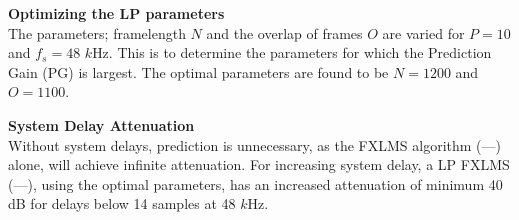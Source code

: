 \large

\begin{minipage}{.43\columnwidth}
 \textbf{Optimizing the LP parameters}\\
The parameters; framelength $N$ and the overlap of frames $O$ are varied for $P=10$ and $f_s=48$ $k$Hz. This is to determine the parameters for which the Prediction Gain (PG) is largest. 
 	The optimal parameters are found to be $N=1200$ and $O=1100$.
	\label{fig:HammingNOP10}
\end{minipage}%
\hspace{4mm}
\begin{minipage}[]{0.5\columnwidth}
	
\end{minipage}

\vspace{4mm}
\begin{minipage}{.43\columnwidth}
	\textbf{System Delay Attenuation}\\
Without system delays, prediction is unnecessary, as the FXLMS algorithm (\textcolor{MATLABblue}{---}) alone, will achieve infinite attenuation. For increasing system delay, a LP FXLMS (\textcolor{MATLABred}{---}), using the optimal parameters, has an increased attenuation of minimum 40 dB for delays below 14 samples at 48 $k$Hz.

\end{minipage}%
\hspace{4mm}
\begin{minipage}{0.5\columnwidth}
	
\end{minipage}
\vspace{4mm}

